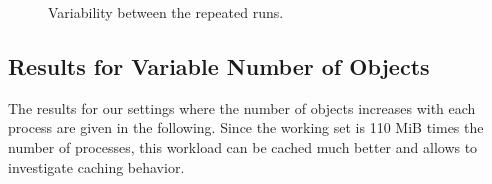 \documentclass[a4paper,10pt]{article}
\begin{document}
\begin{figure}[tb]
\centering
{}
\caption{Variability between the repeated runs. \label{fig:variability}}
\end{figure}





\subsection{Results for Variable Number of Objects}

The results for our settings where the number of objects increases with each process are given in the following.
Since the working set is 110 MiB times the number of processes, this workload can be cached much better and allows to investigate caching behavior.
\end{document}
